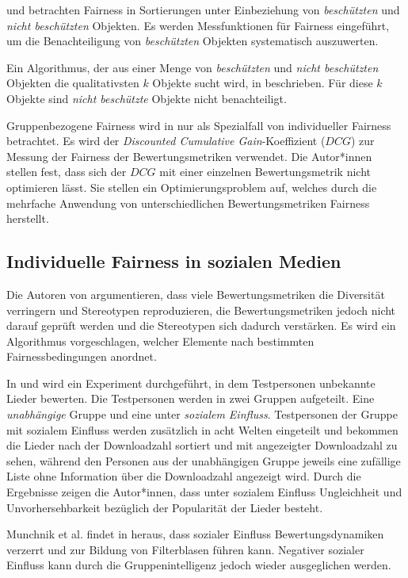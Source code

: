 \cite{Singh20182219} und \cite{Yang2017} betrachten Fairness in Sortierungen unter Einbeziehung von \textit{beschützten} und \textit{nicht beschützten} Objekten. Es werden Messfunktionen für Fairness eingeführt, um die Benachteiligung von \textit{beschützten} Objekten systematisch auszuwerten.

Ein Algorithmus, der aus einer Menge von \textit{beschützten} und \textit{nicht beschützten} Objekten die qualitativsten $k$ Objekte sucht wird, in \cite{Zehlike20171569} beschrieben. Für diese $k$ Objekte sind \textit{nicht beschützte} Objekte nicht benachteiligt.

Gruppenbezogene Fairness wird in \cite{Biega2018405} nur als Spezialfall von individueller Fairness betrachtet. Es wird der \textit{Discounted Cumulative Gain}-Koeffizient ($DCG$) zur Messung der Fairness der Bewertungsmetriken verwendet. Die Autor*innen stellen fest, dass sich der $DCG$ mit einer einzelnen Bewertungsmetrik nicht optimieren lässt. Sie stellen ein Optimierungsproblem auf, welches durch die mehrfache Anwendung von unterschiedlichen Bewertungsmetriken Fairness herstellt.

\subsection{Individuelle Fairness in sozialen Medien}

Die Autoren von \cite{Celis2018} argumentieren, dass viele Bewertungsmetriken die Diversität verringern und Stereotypen reproduzieren, die Bewertungsmetriken jedoch nicht darauf geprüft werden und die Stereotypen sich dadurch verstärken. Es wird ein Algorithmus vorgeschlagen, welcher Elemente nach bestimmten Fairnessbedingungen anordnet.

In \cite{Salganik2006854} und \cite{Abeliuk} wird ein Experiment durchgeführt, in dem Testpersonen unbekannte Lieder bewerten. Die Testpersonen werden in zwei Gruppen aufgeteilt. Eine \textit{unabhängige} Gruppe und eine unter \textit{sozialem Einfluss}. Testpersonen der Gruppe mit sozialem Einfluss werden zusätzlich in acht Welten eingeteilt und bekommen die Lieder nach der Downloadzahl sortiert und mit angezeigter Downloadzahl zu sehen, während den Personen aus der unabhängigen Gruppe jeweils eine zufällige Liste ohne Information über die Downloadzahl angezeigt wird. Durch die Ergebnisse zeigen die Autor*innen, dass unter sozialem Einfluss Ungleichheit und Unvorhersehbarkeit bezüglich der Popularität der Lieder besteht.

Munchnik et al. findet in \cite{Muchnik2013647} heraus, dass sozialer Einfluss Bewertungsdynamiken verzerrt und zur Bildung von Filterblasen führen kann.
Negativer sozialer Einfluss kann durch die Gruppenintelligenz jedoch wieder ausgeglichen werden.

